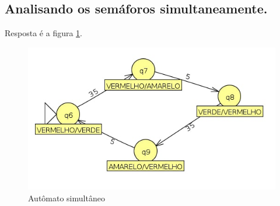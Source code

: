 \documentclass[11pt]{article}
\begin{document}
\subsection{Analisando os semáforos simultaneamente.}
\label{sec:org0cdf968}

Resposta é a figura \ref{fig:orgcc09755}.
\begin{figure}[htbp]
\centering
\includegraphics[width=.9\linewidth]{./q7/simultaneo.jpg}
\caption{\label{fig:orgcc09755}
Autômato simultâneo}
\end{figure}
\end{document}
